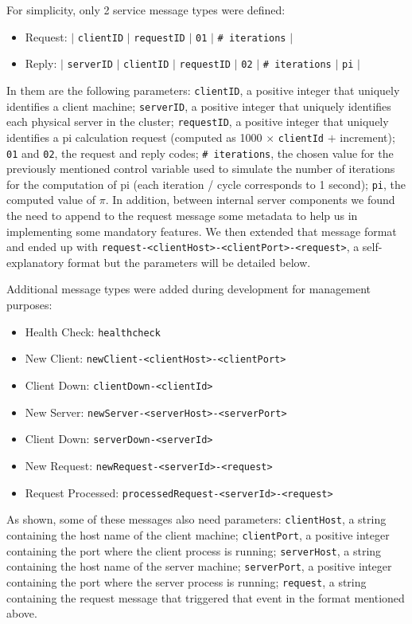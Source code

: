 \documentclass[12pt]{article}
\begin{document}
For simplicity, only 2 service message types were defined:
\vspace{-10pt}
\begin{itemize}[noitemsep]
  \item Request: $|$ \texttt{clientID} $|$ \texttt{requestID} $|$ \texttt{01} $|$ \texttt{\# iterations} $|$
  \item Reply: $|$ \texttt{serverID} $|$ \texttt{clientID} $|$ \texttt{requestID} $|$ \texttt{02} $|$ \texttt{\# iterations} $|$ \texttt{pi} $|$
\end{itemize}
\vspace{-10pt}
In them are the following parameters:
\texttt{clientID}, a positive integer that uniquely identifies a client machine;
\texttt{serverID}, a positive integer that uniquely identifies each physical server in the cluster;
\texttt{requestID}, a positive integer that uniquely identifies a pi calculation request (computed as 1000 $\times$ \texttt{clientId} $+$ increment);
\texttt{01} and \texttt{02}, the request and reply codes;
\texttt{\# iterations}, the chosen value for the previously mentioned control variable used to simulate the number of iterations for the computation of pi
(each iteration / cycle corresponds to 1 second);
\texttt{pi}, the computed value of $\pi$. In addition, between internal server components we found the need to append to the request message some metadata to help us in implementing some mandatory features. We then extended that message format and ended up with \texttt{request-<clientHost>-<clientPort>-<request>}, a self-explanatory format but the parameters will be detailed below.

Additional message types were added during development for management purposes:
\vspace{-10pt}
\begin{itemize}[noitemsep]
  \item Health Check: \texttt{healthcheck}
  \item New Client: \texttt{newClient-<clientHost>-<clientPort>}
  \item Client Down: \texttt{clientDown-<clientId>}
  \item New Server: \texttt{newServer-<serverHost>-<serverPort>}
  \item Client Down: \texttt{serverDown-<serverId>}
  \item New Request: \texttt{newRequest-<serverId>-<request>}
  \item Request Processed: \texttt{processedRequest-<serverId>-<request>}
\end{itemize}
\vspace{-10pt}
As shown, some of these messages also need parameters: 
\texttt{clientHost}, a string containing the host name of the client machine; 
\texttt{clientPort}, a positive integer containing the port where the client process is running; 
\texttt{serverHost}, a string containing the host name of the server machine; 
\texttt{serverPort}, a positive integer containing the port where the server process is running; 
\texttt{request}, a string containing the request message that triggered that event in the format mentioned above.
\end{document}
